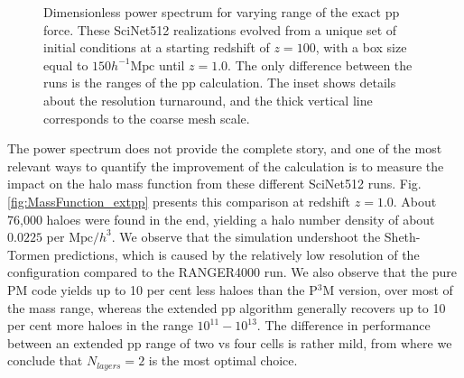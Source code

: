 \documentclass[useAMS,usenatbib]{mn2e}
\begin{document}
\begin{figure}
  \begin{center}
  \caption{ Dimensionless power spectrum for varying range of the exact pp force.
  These SciNet512 realizations evolved from a unique set of initial conditions at a starting redshift of $z = 100$, with a box size equal to $ 150 h^{-1}\mbox{Mpc}$ 
  until $z=1.0$. The only difference between the runs is the ranges of the pp calculation. The inset shows details about the resolution turnaround, and the
  thick vertical line corresponds to the coarse mesh scale. }
    \label{fig:power}
  \end{center}
\end{figure}



The power spectrum does not provide the complete story, and one of the most relevant ways to quantify the improvement of the calculation is to measure the impact on the halo mass function from these different SciNet512 runs. Fig. \ref{fig:MassFunction_extpp} presents this comparison at redshift $z = 1.0$. About 76,000 haloes were found in the end, yielding a halo number density of about $0.0225$ per $\mbox{Mpc/$h$}^{3}$. 
We observe that the simulation undershoot the Sheth-Tormen predictions, which is caused by the relatively low resolution of the configuration
compared to the RANGER4000 run. 
We also observe that the pure PM code yields up to 10 per cent less haloes than the P$^{3}$M version, over most of the mass range,
whereas the extended pp algorithm generally recovers  up to 10 per cent more haloes in the range $10^{11} - 10^{13}$.
The difference in performance between an extended pp  range of two vs four cells is rather mild, from where
we conclude that $N_{layers} = 2$ is the most optimal choice.
\end{document}
